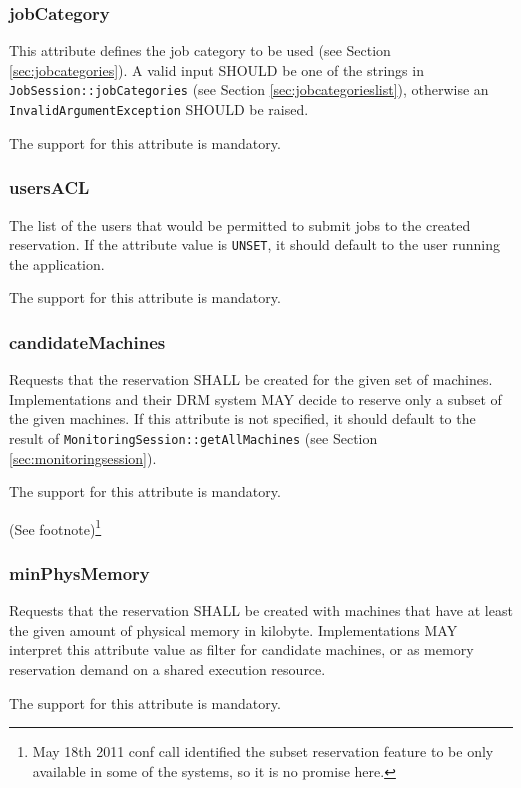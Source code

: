 \documentclass{article}
\newcommand{\h}[1]{\lstinline|#1|}
\newcommand{\rat}[1]{ {\tiny(See footnote)}\footnote{#1} }
\begin{document}
\subsubsection{jobCategory}

This attribute defines the job category to be used (see Section \ref{sec:jobcategories}). A valid input SHOULD be one of the strings in \h{JobSession::jobCategories} (see Section \ref{sec:jobcategorieslist}), otherwise an \h{InvalidArgumentException} SHOULD be raised.

The support for this attribute is mandatory.

\subsubsection{usersACL}

The list of the users that would be permitted to submit jobs to the created reservation. If the attribute value is \h{UNSET}, it should default to the user running the application.

The support for this attribute is mandatory.

\subsubsection{candidateMachines}

Requests that the reservation SHALL be created for the given set of machines. Implementations and their DRM system MAY decide to reserve only a subset of the given machines. If this attribute is not specified, it should default to the result of \h{MonitoringSession::getAllMachines} (see Section \ref{sec:monitoringsession}).

The support for this attribute is mandatory.

\rat{May 18th 2011 conf call identified the subset reservation feature to be only available in some of the systems, so it is no promise here.}

\subsubsection{minPhysMemory}

Requests that the reservation SHALL be created with machines that have at least the given amount of physical memory in kilobyte. Implementations MAY interpret this attribute value as filter for candidate machines, or as memory reservation demand on a shared execution resource.

The support for this attribute is mandatory. 
\end{document}

